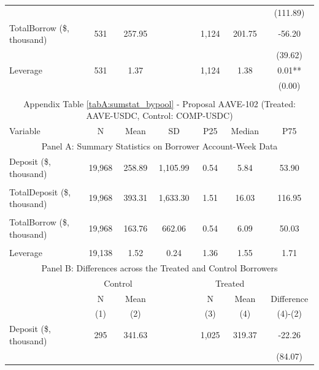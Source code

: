 \begin{table}[ht!]
\begin{tabular*}{\linewidth}{@{\extracolsep{\fill}}lcccccc }
          &       &       &       &       &       & (111.89) \\
    TotalBorrow (\$, thousand) & 531   & 257.95 &       & 1,124 & 201.75 & -56.20 \\
          &       &       &       &       &       & (39.62) \\
    Leverage & 531   & 1.37  &       & 1,124 & 1.38  & 0.01** \\
          &       &       &       &       &       & (0.00) \\
    \bottomrule
          &       &       &       &       &       &  \\
      \multicolumn{7}{c}{Appendix Table \ref{tabA:sumstat_bypool} - Proposal AAVE-102 (Treated: AAVE-USDC, Control: COMP-USDC)} \\
  \toprule
     Variable  &N & Mean & SD & P25 & Median & P75 \\
     \midrule
    \multicolumn{7}{c}{Panel A: Summary Statistics on Borrower Account-Week Data} \\
    \midrule
    Deposit (\$, thousand) & 19,968 & 258.89 & 1,105.99 & 0.54  & 5.84  & 53.90 \\
          &       &       &       &       &       &  \\
    TotalDeposit (\$, thousand) & 19,968 & 393.31 & 1,633.30 & 1.51  & 16.03 & 116.95 \\
          &       &       &       &       &       &  \\
    TotalBorrow (\$, thousand) & 19,968 & 163.76 & 662.06 & 0.54  & 6.09  & 50.03 \\
          &       &       &       &       &       &  \\
    Leverage & 19,138 & 1.52  & 0.24  & 1.36  & 1.55  & 1.71 \\
    \midrule
        \multicolumn{7}{c}{Panel B: Differences across the Treated and Control Borrowers} \\
\midrule
          & \multicolumn{2}{c}{Control} &       & \multicolumn{2}{c}{Treated} &  \\
\cmidrule{2-3}\cmidrule{5-6}          & N & Mean &       & N & Mean & Difference \\
\cmidrule{2-3}\cmidrule{5-6}          & (1) & (2) &       & (3) & (4) & (4)-(2) \\
\cmidrule{2-7}    Deposit (\$, thousand) & 295   & 341.63 &       & 1,025 & 319.37 & -22.26 \\
          &       &       &       &       &       & (84.07) \\

\end{tabular*}
\end{table}
